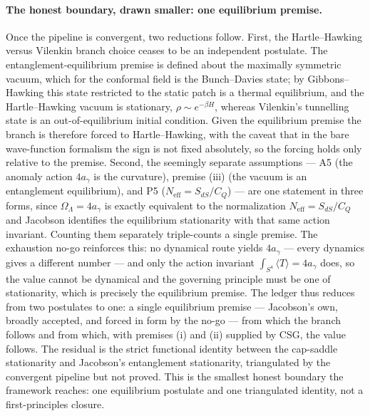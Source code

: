 \documentclass[11pt,a4paper]{article}
\theoremstyle{plain}
\theoremstyle{definition}
\theoremstyle{remark}
\newcommand{\OL}{\Omega_\Lambda}
\newcommand{\ag}{a_\gamma}
\newcommand{\CQ}{C_Q}
\begin{document}
\paragraph{The honest boundary, drawn smaller: one equilibrium premise.} Once the pipeline is
convergent, two reductions follow. First, the Hartle--Hawking versus Vilenkin branch choice ceases
to be an independent postulate. The entanglement-equilibrium premise is defined about the maximally
symmetric vacuum, which for the conformal field is the Bunch--Davies state; by Gibbons--Hawking this
state restricted to the static patch is a thermal equilibrium, and the Hartle--Hawking vacuum is
stationary, $\rho\sim e^{-\beta H}$, whereas Vilenkin's tunnelling state is an out-of-equilibrium
initial condition. Given the equilibrium premise the branch is therefore forced to Hartle--Hawking,
with the caveat that in the bare wave-function formalism the sign is not fixed absolutely, so the
forcing holds only relative to the premise. Second, the seemingly separate assumptions --- A5
(the anomaly action $4\ag$ is the curvature), premise (iii) (the vacuum is an entanglement
equilibrium), and P5 ($N_{\mathrm{eff}}=S_{dS}/\CQ$) --- are one statement in three forms, since
$\OL=4\ag$ is exactly equivalent to the normalization $N_{\mathrm{eff}}=S_{dS}/\CQ$ and Jacobson
identifies the equilibrium stationarity with that same action invariant. Counting them separately
triple-counts a single premise. The exhaustion no-go reinforces this: no dynamical route yields
$4\ag$ --- every dynamics gives a different number --- and only the action invariant
$\int_{S^4}\langle T\rangle=4\ag$ does, so the value cannot be dynamical and the governing principle
must be one of stationarity, which is precisely the equilibrium premise. The ledger thus reduces from
two postulates to one: a single equilibrium premise --- Jacobson's own, broadly accepted, and forced
in form by the no-go --- from which the branch follows and from which, with premises (i) and (ii)
supplied by CSG, the value follows. The residual is the strict functional identity between the
cap-saddle stationarity and Jacobson's entanglement stationarity, triangulated by the convergent
pipeline but not proved. This is the smallest honest boundary the framework reaches: one equilibrium
postulate and one triangulated identity, not a first-principles closure.
\end{document}
